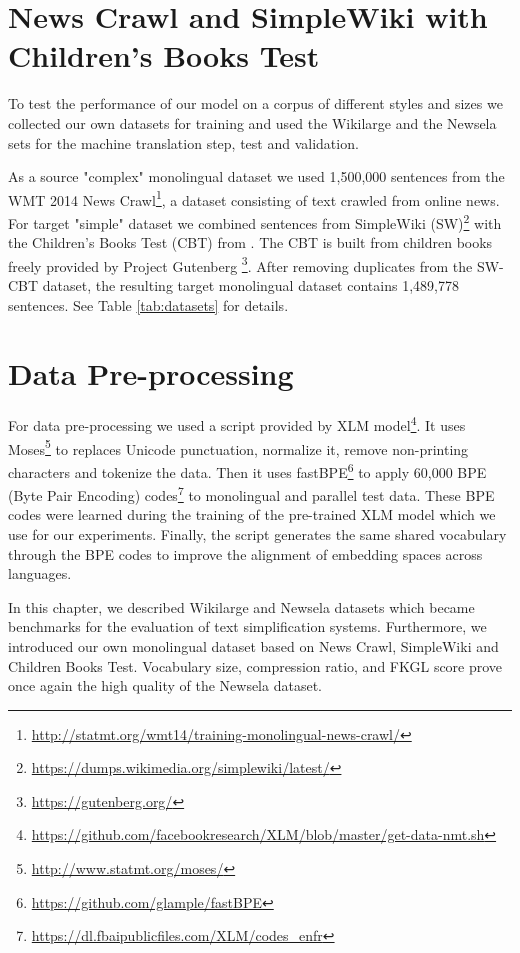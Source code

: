 \section{News Crawl and SimpleWiki with Children's Books Test}
\label{dataset:sw-cbt}

To test the performance of our model on a corpus of different styles and sizes we collected our own datasets for training and used the Wikilarge and the Newsela sets for the machine translation step, test and validation.

As a source "complex" monolingual dataset we used 1,500,000 sentences from the WMT 2014 News Crawl\footnote{\href{http://statmt.org/wmt14/training-monolingual-news-crawl/}{http://statmt.org/wmt14/training-monolingual-news-crawl/}}, a dataset consisting of text crawled from online news. For target "simple" dataset we combined sentences from SimpleWiki (SW)\footnote{\href{https://dumps.wikimedia.org/simplewiki/latest/}{https://dumps.wikimedia.org/simplewiki/latest/}} with the Children's Books Test (CBT) from \cite{Hill2015TheGP}. The CBT is built from children books freely provided by Project Gutenberg \footnote{\href{https://gutenberg.org/}{https://gutenberg.org/}}. After removing duplicates from the SW-CBT dataset, the resulting target monolingual dataset contains 1,489,778 sentences. See Table \ref{tab:datasets} for details.


\section{Data Pre-processing}

For data pre-processing we used a script provided by XLM model\footnote{\href{https://github.com/facebookresearch/XLM/blob/master/get-data-nmt.sh}{https://github.com/facebookresearch/XLM/blob/master/get-data-nmt.sh}}. It uses Moses\footnote{\href{http://www.statmt.org/moses/}{http://www.statmt.org/moses/}} to replaces Unicode punctuation, normalize it, remove non-printing characters and tokenize the data. Then it uses fastBPE\footnote{\href{https://github.com/glample/fastBPE}{https://github.com/glample/fastBPE}} to apply 60,000 BPE (Byte Pair Encoding) codes\footnote{\href{https://dl.fbaipublicfiles.com/XLM/codes_enfr}{https://dl.fbaipublicfiles.com/XLM/codes\_enfr}} to monolingual and parallel test data. These BPE codes were learned during the training of the pre-trained XLM model which we use for our experiments. Finally, the script generates the same shared vocabulary through the BPE codes to improve the alignment of embedding spaces across languages.

\bigskip
In this chapter, we described Wikilarge and Newsela datasets which became benchmarks for the evaluation of text simplification systems. Furthermore, we introduced our own monolingual dataset based on News Crawl, SimpleWiki and Children Books Test. Vocabulary size, compression ratio, and FKGL score prove once again the high quality of the Newsela dataset.

\endinput
